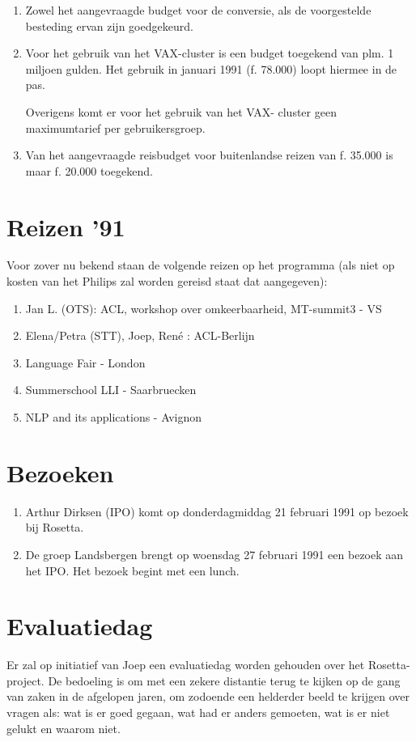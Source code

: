 \begin{enumerate}
  \item 
Zowel het aangevraagde budget voor de conversie, als de voorgestelde 
besteding ervan zijn goedgekeurd.
  \item
Voor het gebruik van het VAX-cluster is een budget toegekend van 
plm. 1 miljoen gulden. Het gebruik in januari 1991 (f. 78.000) 
loopt hiermee in de pas.

Overigens komt er
voor het gebruik van het VAX-
cluster geen maximumtarief  per gebruikersgroep. 
\item Van het aangevraagde reisbudget voor buitenlandse reizen   van 
f. 35.000 is maar f. 20.000 toegekend.
\end{enumerate}

\section{\bf Reizen '91}
Voor zover nu bekend staan de volgende reizen op het programma (als niet op 
kosten van het Philips zal worden gereisd 
staat dat aangegeven):

\begin{enumerate}
  \item Jan L. (OTS): ACL, workshop over omkeerbaarheid, MT-summit3 - VS
  \item Elena/Petra (STT), Joep, Ren\'{e} : ACL-Berlijn 
  \item Language Fair - London 
  \item Summerschool LLI - Saarbruecken 
  \item NLP and its applications - Avignon 
\end{enumerate}


\section{\bf Bezoeken}
\begin{enumerate}
  \item  
Arthur Dirksen (IPO) komt op donderdagmiddag  21 februari 1991  op bezoek bij 
Rosetta.
  \item 
De groep Landsbergen brengt op woensdag 27 februari 1991 een bezoek 
aan het IPO. Het bezoek begint met een lunch.
\end{enumerate}

  \section{\bf Evaluatiedag}
Er zal op initiatief van Joep een evaluatiedag worden gehouden over het 
Rosetta-project. 
De bedoeling is om met  een zekere distantie terug te kijken 
op de gang van zaken in de
afgelopen jaren, om zodoende  
een helderder beeld te krijgen
over vragen als: wat is er goed gegaan, wat had er anders gemoeten, wat is 
er niet gelukt en waarom niet.

